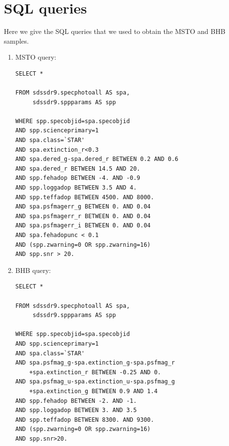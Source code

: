 \documentclass[useAMS,twocolumn,usenatbib]{mn2e}
\begin{document}



\appendix

\section{SQL queries}
\label{sec:sql}

Here we give the {\sc SQL} queries that we used to obtain the MSTO and BHB samples.

\begin{enumerate}
\item MSTO query:
%
\begin{verbatim}
SELECT *

FROM sdssdr9.specphotoall AS spa,
     sdssdr9.sppparams AS spp

WHERE spp.specobjid=spa.specobjid
AND spp.scienceprimary=1 
AND spa.class=`STAR' 
AND spa.extinction_r<0.3
AND spa.dered_g-spa.dered_r BETWEEN 0.2 AND 0.6 
AND spa.dered_r BETWEEN 14.5 AND 20. 
AND spp.fehadop BETWEEN -4. AND -0.9 
AND spp.loggadop BETWEEN 3.5 AND 4. 
AND spp.teffadop BETWEEN 4500. AND 8000.
AND spa.psfmagerr_g BETWEEN 0. AND 0.04
AND spa.psfmagerr_r BETWEEN 0. AND 0.04
AND spa.psfmagerr_i BETWEEN 0. AND 0.04
AND spa.fehadopunc < 0.1 
AND (spp.zwarning=0 OR spp.zwarning=16)
AND spp.snr > 20.
\end{verbatim}
%
\item BHB query:
%
\begin{verbatim}
SELECT * 

FROM sdssdr9.specphotoall AS spa,
     sdssdr9.sppparams AS spp
     
WHERE spp.specobjid=spa.specobjid
AND spp.scienceprimary=1
AND spa.class=`STAR'
AND spa.psfmag_g-spa.extinction_g-spa.psfmag_r
    +spa.extinction_r BETWEEN -0.25 AND 0.
AND spa.psfmag_u-spa.extinction_u-spa.psfmag_g
    +spa.extinction_g BETWEEN 0.9 AND 1.4
AND spp.fehadop BETWEEN -2. AND -1.
AND spp.loggadop BETWEEN 3. AND 3.5
AND spp.teffadop BETWEEN 8300. AND 9300.
AND (spp.zwarning=0 OR spp.zwarning=16)
AND spp.snr>20.
\end{verbatim}
\end{enumerate}
\end{document}

